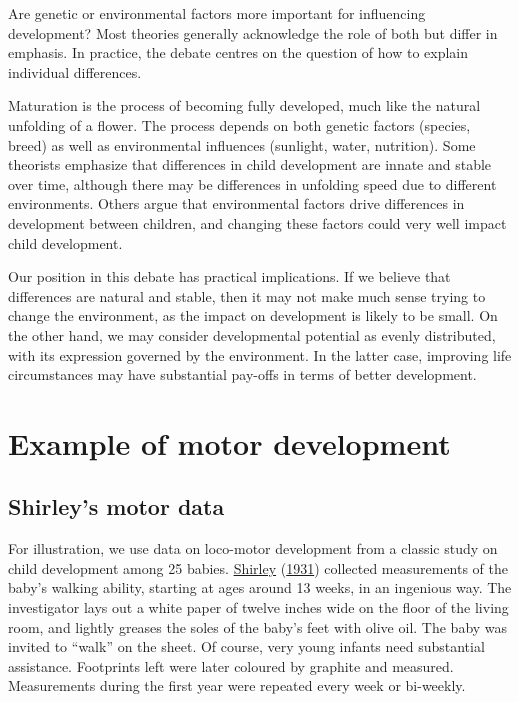\documentclass[
]{book}
\begin{document}
Are genetic or environmental factors more important for influencing development? Most theories generally acknowledge the role of both but differ in emphasis. In practice, the debate centres on the question of how to explain individual differences.

Maturation is the process of becoming fully developed, much like the natural unfolding of a flower. The process depends on both genetic factors (species, breed) as well as environmental influences (sunlight, water, nutrition). Some theorists emphasize that differences in child development are innate and stable over time, although there may be differences in unfolding speed due to different environments. Others argue that environmental factors drive differences in development between children, and changing these factors could very well impact child development.

Our position in this debate has practical implications. If we believe that differences are natural and stable, then it may not make much sense trying to change the environment, as the impact on development is likely to be small. On the other hand, we may consider developmental potential as evenly distributed, with its expression governed by the environment. In the latter case, improving life circumstances may have substantial pay-offs in terms of better development.

\hypertarget{sec:motorexample}{%
\section{Example of motor development}\label{sec:motorexample}}

\hypertarget{shirleys-motor-data}{%
\subsection{Shirley's motor data}\label{shirleys-motor-data}}

For illustration, we use data on loco-motor development from a classic study on child development among 25 babies. \protect\hyperlink{ref-shirley1931}{Shirley} (\protect\hyperlink{ref-shirley1931}{1931}) collected measurements of the baby's walking ability, starting at ages around 13 weeks, in an ingenious way. The investigator lays out a white paper of twelve inches wide on the floor of the living room, and lightly greases the soles of the baby's feet with olive oil. The baby was invited to ``walk'' on the sheet. Of course, very young infants need substantial assistance. Footprints left were later coloured by graphite and measured. Measurements during the first year were repeated every week or bi-weekly.
\end{document}
